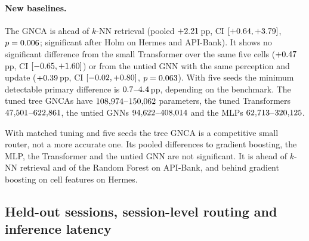 \documentclass[10pt]{article}
\begin{document}
\paragraph{New baselines.} The GNCA is ahead of $k$-NN retrieval (pooled $+2.21$\,pp, CI $[+0.64, +3.79]$, $p=0.006$; significant after Holm on Hermes and API-Bank). It shows no significant difference from the small Transformer over the same five cells ($+0.47$\,pp, CI $[-0.65, +1.60]$) or from the untied GNN with the same perception and update ($+0.39$\,pp, CI $[-0.02, +0.80]$, $p=0.063$). With five seeds the minimum detectable primary difference is $0.7$--$4.4$\,pp, depending on the benchmark. The tuned tree GNCAs have $108{,}974$--$150{,}062$ parameters, the tuned Transformers $47{,}501$--$622{,}861$, the untied GNNs $94{,}622$--$408{,}014$ and the MLPs $62{,}713$--$320{,}125$.

With matched tuning and five seeds the tree GNCA is a competitive small router, not a more accurate one. Its pooled differences to gradient boosting, the MLP, the Transformer and the untied GNN are not significant. It is ahead of $k$-NN retrieval and of the Random Forest on API-Bank, and behind gradient boosting on cell features on Hermes.

\subsection{Held-out sessions, session-level routing and inference latency}\label{sec:deploy}
\begin{table}[t]
\centering
\scriptsize
\caption{Deployment-oriented measures for the tuned models (five seeds). OOD: $\numROodN$ turns from $\numROodSess$ private Hermes sessions of one user, never used for training, selection or tuning; 95\% CI by session bootstrap; $\Delta$: tree GNCA minus model ($^{\dagger}$: Holm $p<0.05$ over 12). Sessions all correct: share of sessions in which every turn is routed correctly (Hermes test, $\numRSesHerN$ sessions; OOD, $\numROodSess$). CPU time: batch 1, one thread, median over $\numRLatN$ Hermes test turns, mean over seeds 0--2; inference is the model call alone, featurisation (TF-IDF, SVD and tabular or cell features, unoptimised Python) is preprocessing, pipeline is their sum. Size: serialised model without the shared featuriser. Source S8.}
\label{tab:rig-deploy}

\end{table}
\end{document}
